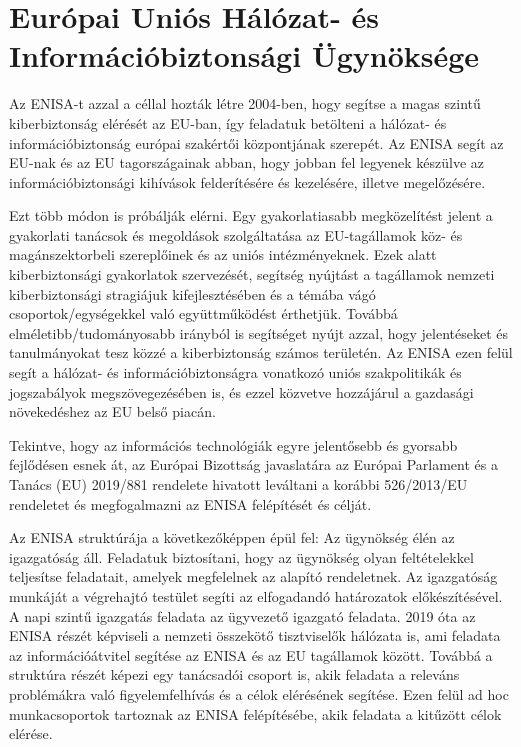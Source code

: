 \section{Európai Uniós Hálózat- és Információbiztonsági Ügynöksége}

Az ENISA-t azzal a céllal hozták létre 2004-ben, hogy segítse a magas szintű kiberbiztonság elérését az EU-ban, így feladatuk betölteni a hálózat- és információbiztonság európai szakértői központjának szerepét. Az ENISA segít az EU-nak és az EU tagországainak abban, hogy jobban fel legyenek készülve az információbiztonsági kihívások felderítésére és kezelésére, illetve megelőzésére.

Ezt több módon is próbálják elérni. Egy gyakorlatiasabb megközelítést jelent a gyakorlati tanácsok és megoldások szolgáltatása az EU-tagállamok köz- és magánszektorbeli szereplőinek és az uniós intézményeknek. Ezek alatt kiberbiztonsági gyakorlatok szervezését, segítség nyújtást a tagállamok nemzeti kiberbiztonsági stragiájuk kifejlesztésében és a témába vágó csoportok/egységekkel való együttműködést érthetjük. Továbbá elméletibb/tudományosabb irányból is segítséget nyújt azzal, hogy jelentéseket és tanulmányokat tesz közzé a kiberbiztonság számos területén. Az ENISA ezen felül segít a hálózat- és információbiztonságra vonatkozó uniós szakpolitikák és jogszabályok megszövegezésében is, és ezzel közvetve hozzájárul a gazdasági növekedéshez az EU belső piacán.

Tekintve, hogy az információs technológiák egyre jelentősebb és gyorsabb fejlődésen esnek át, az Európai Bizottság javaslatára az Európai Parlament és a Tanács (EU) 2019/881 rendelete \cite{2019/881} hivatott leváltani a korábbi 526/2013/EU rendeletet és megfogalmazni az ENISA felépítését és célját.

Az ENISA struktúrája a következőképpen épül fel: Az ügynökség élén az igazgatóság áll. Feladatuk biztosítani, hogy az ügynökség olyan feltételekkel teljesítse feladatait, amelyek megfelelnek az alapító rendeletnek. Az igazgatóság munkáját a végrehajtó testület segíti az elfogadandó határozatok előkészítésével. A napi szintű igazgatás feladata az ügyvezető igazgató feladata. 2019 óta az ENISA részét képviseli a nemzeti összekötő tisztviselők hálózata is, ami feladata az információátvitel segítése az ENISA és az EU tagállamok között. Továbbá a struktúra részét képezi egy tanácsadói csoport is, akik feladata a releváns problémákra való figyelemfelhívás és a célok elérésének segítése. Ezen felül ad hoc munkacsoportok tartoznak az ENISA felépítésébe, akik feladata a kitűzött célok elérése.

